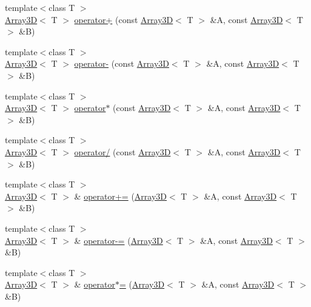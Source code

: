 \begin{DoxyCompactItemize}
\item 
{\footnotesize template$<$class T $>$ }\\\hyperlink{classTNT_1_1Array3D}{Array3D}$<$ T $>$ \hyperlink{namespaceTNT_a05f55a06994091a44d0c6ae743d9c0fc}{operator+} (const \hyperlink{classTNT_1_1Array3D}{Array3D}$<$ T $>$ \&A, const \hyperlink{classTNT_1_1Array3D}{Array3D}$<$ T $>$ \&B)
\item 
{\footnotesize template$<$class T $>$ }\\\hyperlink{classTNT_1_1Array3D}{Array3D}$<$ T $>$ \hyperlink{namespaceTNT_a322eb831bd13a3a44822b1351d6f601e}{operator-\/} (const \hyperlink{classTNT_1_1Array3D}{Array3D}$<$ T $>$ \&A, const \hyperlink{classTNT_1_1Array3D}{Array3D}$<$ T $>$ \&B)
\item 
{\footnotesize template$<$class T $>$ }\\\hyperlink{classTNT_1_1Array3D}{Array3D}$<$ T $>$ \hyperlink{namespaceTNT_acee7fc2b1dccb1c2525cfb286a47e2ed}{operator$\ast$} (const \hyperlink{classTNT_1_1Array3D}{Array3D}$<$ T $>$ \&A, const \hyperlink{classTNT_1_1Array3D}{Array3D}$<$ T $>$ \&B)
\item 
{\footnotesize template$<$class T $>$ }\\\hyperlink{classTNT_1_1Array3D}{Array3D}$<$ T $>$ \hyperlink{namespaceTNT_a2252a78369b90a4852da38ce2d8a732b}{operator/} (const \hyperlink{classTNT_1_1Array3D}{Array3D}$<$ T $>$ \&A, const \hyperlink{classTNT_1_1Array3D}{Array3D}$<$ T $>$ \&B)
\item 
{\footnotesize template$<$class T $>$ }\\\hyperlink{classTNT_1_1Array3D}{Array3D}$<$ T $>$ \& \hyperlink{namespaceTNT_abd844f41c5e4dd936c99b5a7d35e5af0}{operator+=} (\hyperlink{classTNT_1_1Array3D}{Array3D}$<$ T $>$ \&A, const \hyperlink{classTNT_1_1Array3D}{Array3D}$<$ T $>$ \&B)
\item 
{\footnotesize template$<$class T $>$ }\\\hyperlink{classTNT_1_1Array3D}{Array3D}$<$ T $>$ \& \hyperlink{namespaceTNT_a059e5ad1d2ce6b2c4d96f9cf87c68a04}{operator-\/=} (\hyperlink{classTNT_1_1Array3D}{Array3D}$<$ T $>$ \&A, const \hyperlink{classTNT_1_1Array3D}{Array3D}$<$ T $>$ \&B)
\item 
{\footnotesize template$<$class T $>$ }\\\hyperlink{classTNT_1_1Array3D}{Array3D}$<$ T $>$ \& \hyperlink{namespaceTNT_a537d33bfd218ca51057f36162d042ada}{operator$\ast$=} (\hyperlink{classTNT_1_1Array3D}{Array3D}$<$ T $>$ \&A, const \hyperlink{classTNT_1_1Array3D}{Array3D}$<$ T $>$ \&B)

\end{DoxyCompactItemize}
